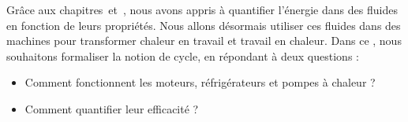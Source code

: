 Grâce aux chapitres~\quatre et~\cinq, nous avons appris à quantifier l’énergie dans des fluides en fonction de leurs propriétés. Nous allons désormais utiliser ces fluides dans des machines pour transformer chaleur en travail et travail en chaleur. Dans ce \courssix, nous souhaitons formaliser la notion de cycle, en répondant à deux questions :
\begin{itemize}
	\item Comment fonctionnent les moteurs, réfrigérateurs et pompes à chaleur ?
	\item Comment quantifier leur efficacité ?
\end{itemize}
